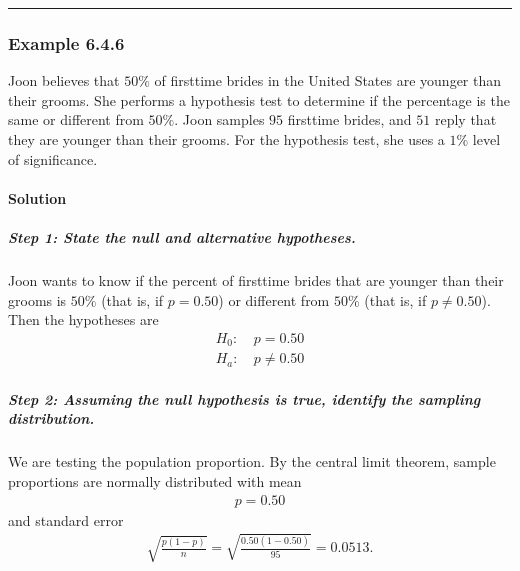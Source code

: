 \documentclass[letterpaper,10pt,english]{jupyterBook}
\begin{document}
\bigskip\hrule\bigskip



\subsubsection{Example 6.4.6}
\label{\detokenize{Ch6 An Introduction to Hypothesis Testing/6.4 Hypothesis Tests of One Population:example-6-4-6}}
\sphinxAtStartPar
Joon believes that \(50\%\) of first\sphinxhyphen{}time brides in the United States are younger than their grooms. She performs a hypothesis test to determine if the percentage is the same or different from \(50\%\). Joon samples \(95\) first\sphinxhyphen{}time brides, and \(51\) reply that they are younger than their grooms. For the hypothesis test, she uses a \(1\%\) level of significance.


\paragraph{Solution}
\label{\detokenize{Ch6 An Introduction to Hypothesis Testing/6.4 Hypothesis Tests of One Population:id9}}

\subparagraph{Step 1: State the null and alternative hypotheses.}
\label{\detokenize{Ch6 An Introduction to Hypothesis Testing/6.4 Hypothesis Tests of One Population:id10}}
\sphinxAtStartPar
Joon wants to know if the percent of first\sphinxhyphen{}time brides that are younger than their grooms is \(50\%\) (that is, if \(p = 0.50\)) or different from \(50\%\) (that is, if \(p \neq 0.50\)). Then the hypotheses are
\begin{align*}
H_0:&\ p = 0.50 \\
H_a:&\ p \neq 0.50
\end{align*}

\subparagraph{Step 2: Assuming the null hypothesis is true, identify the sampling distribution.}
\label{\detokenize{Ch6 An Introduction to Hypothesis Testing/6.4 Hypothesis Tests of One Population:id11}}
\sphinxAtStartPar
We are testing the population proportion. By the central limit theorem, sample proportions are normally distributed with mean
\begin{equation*}
\begin{split} p = 0.50 \end{split}
\end{equation*}
\sphinxAtStartPar
and standard error
\begin{equation*}
\begin{split} \sqrt{\frac{p(1 - p)}{n}} = \sqrt{\frac{0.50(1 - 0.50)}{95}} = 0.0513. \end{split}
\end{equation*}
\end{document}
